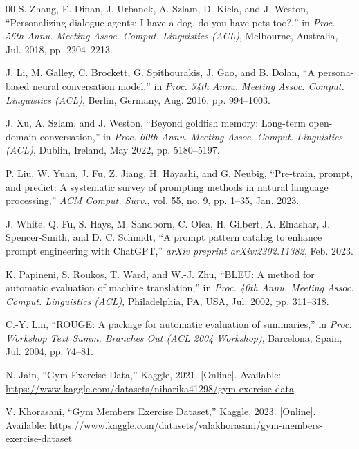 \documentclass[conference]{IEEEtran}
\begin{document}
\begin{thebibliography}{00}
S. Zhang, E. Dinan, J. Urbanek, A. Szlam, D. Kiela, and J. Weston, ``Personalizing dialogue agents: I have a dog, do you have pets too?,'' in \textit{Proc. 56th Annu. Meeting Assoc. Comput. Linguistics (ACL)}, Melbourne, Australia, Jul. 2018, pp. 2204--2213.

J. Li, M. Galley, C. Brockett, G. Spithourakis, J. Gao, and B. Dolan, ``A persona-based neural conversation model,'' in \textit{Proc. 54th Annu. Meeting Assoc. Comput. Linguistics (ACL)}, Berlin, Germany, Aug. 2016, pp. 994--1003.

J. Xu, A. Szlam, and J. Weston, ``Beyond goldfish memory: Long-term open-domain conversation,'' in \textit{Proc. 60th Annu. Meeting Assoc. Comput. Linguistics (ACL)}, Dublin, Ireland, May 2022, pp. 5180--5197.

P. Liu, W. Yuan, J. Fu, Z. Jiang, H. Hayashi, and G. Neubig, ``Pre-train, prompt, and predict: A systematic survey of prompting methods in natural language processing,'' \textit{ACM Comput. Surv.}, vol. 55, no. 9, pp. 1--35, Jan. 2023.

J. White, Q. Fu, S. Hays, M. Sandborn, C. Olea, H. Gilbert, A. Elnashar, J. Spencer-Smith, and D. C. Schmidt, ``A prompt pattern catalog to enhance prompt engineering with ChatGPT,'' \textit{arXiv preprint arXiv:2302.11382}, Feb. 2023.

K. Papineni, S. Roukos, T. Ward, and W.-J. Zhu, ``BLEU: A method for automatic evaluation of machine translation,'' in \textit{Proc. 40th Annu. Meeting Assoc. Comput. Linguistics (ACL)}, Philadelphia, PA, USA, Jul. 2002, pp. 311--318.

C.-Y. Lin, ``ROUGE: A package for automatic evaluation of summaries,'' in \textit{Proc. Workshop Text Summ. Branches Out (ACL 2004 Workshop)}, Barcelona, Spain, Jul. 2004, pp. 74--81.

N. Jain, ``Gym Exercise Data,'' Kaggle, 2021. [Online]. Available: \url{https://www.kaggle.com/datasets/niharika41298/gym-exercise-data}

V. Khorasani, ``Gym Members Exercise Dataset,'' Kaggle, 2023. [Online]. Available: \url{https://www.kaggle.com/datasets/valakhorasani/gym-members-exercise-dataset}

\end{thebibliography}
\end{document}
